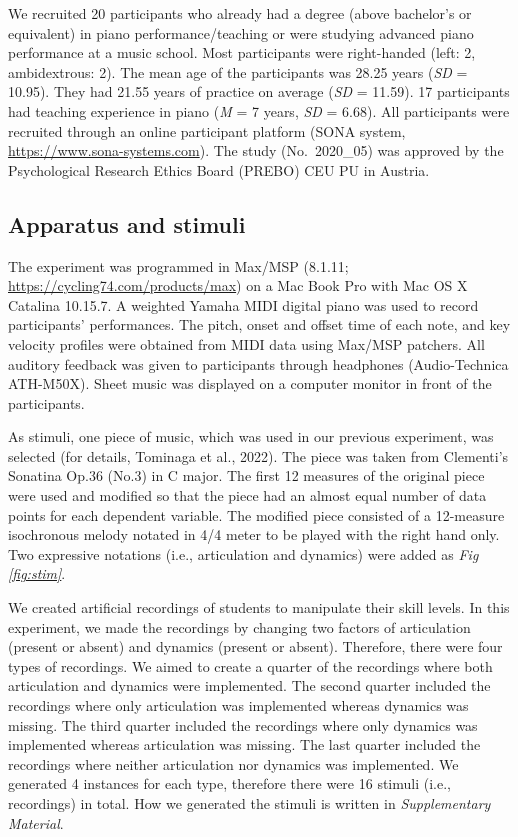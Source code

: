 \documentclass[
  man]{apa6}
\begin{document}
We recruited 20 participants who already had a degree (above bachelor's or equivalent) in piano performance/teaching or were studying advanced piano performance at a music school. Most participants were right-handed (left: 2, ambidextrous: 2). The mean age of the participants was 28.25 years (\emph{SD} = 10.95). They had 21.55 years of practice on average (\emph{SD} = 11.59). 17 participants had teaching experience in piano (\emph{M} = 7 years, \emph{SD} = 6.68). All participants were recruited through an online participant platform (SONA system, \url{https://www.sona-systems.com}). The study (No.~2020\_05) was approved by the Psychological Research Ethics Board (PREBO) CEU PU in Austria.

\hypertarget{apparatus-and-stimuli}{%
\subsection{Apparatus and stimuli}\label{apparatus-and-stimuli}}

The experiment was programmed in Max/MSP (8.1.11; \url{https://cycling74.com/products/max}) on a Mac Book Pro with Mac OS X Catalina 10.15.7. A weighted Yamaha MIDI digital piano was used to record participants' performances. The pitch, onset and offset time of each note, and key velocity profiles were obtained from MIDI data using Max/MSP patchers. All auditory feedback was given to participants through headphones (Audio-Technica ATH-M50X). Sheet music was displayed on a computer monitor in front of the participants.

As stimuli, one piece of music, which was used in our previous experiment, was selected (for details, Tominaga et al., 2022). The piece was taken from Clementi's Sonatina Op.36 (No.3) in C major. The first 12 measures of the original piece were used and modified so that the piece had an almost equal number of data points for each dependent variable. The modified piece consisted of a 12-measure isochronous melody notated in 4/4 meter to be played with the right hand only. Two expressive notations (i.e., articulation and dynamics) were added as \emph{Fig \ref{fig:stim}}.

We created artificial recordings of students to manipulate their skill levels. In this experiment, we made the recordings by changing two factors of articulation (present or absent) and dynamics (present or absent). Therefore, there were four types of recordings. We aimed to create a quarter of the recordings where both articulation and dynamics were implemented. The second quarter included the recordings where only articulation was implemented whereas dynamics was missing. The third quarter included the recordings where only dynamics was implemented whereas articulation was missing. The last quarter included the recordings where neither articulation nor dynamics was implemented. We generated 4 instances for each type, therefore there were 16 stimuli (i.e., recordings) in total. How we generated the stimuli is written in \emph{Supplementary Material}.
\end{document}
